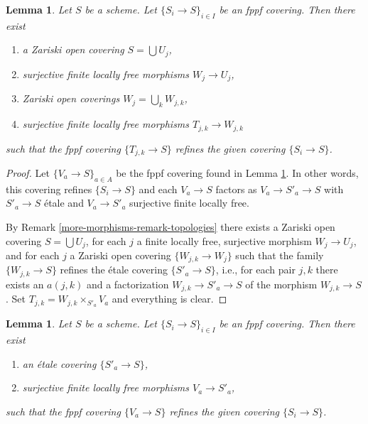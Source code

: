 \documentclass{amsart}
\theoremstyle{plain}
\newtheorem{lemma}[subsection]{Lemma}
\theoremstyle{definition}
\theoremstyle{remark}
\numberwithin{equation}{subsection}
\begin{document}
\begin{lemma}
\label{more-morphisms-lemma-dominate-fppf}
Let $S$ be a scheme. Let $\{S_i \to S\}_{i \in I}$ be an fppf covering.
Then there exist
\begin{enumerate}
\item a Zariski open covering $S = \bigcup U_j$,
\item surjective finite locally free morphisms $W_j \to U_j$,
\item Zariski open coverings $W_j = \bigcup_k W_{j, k}$,
\item surjective finite locally free morphisms $T_{j, k} \to W_{j, k}$
\end{enumerate}
such that the fppf covering $\{T_{j, k} \to S\}$ refines the given
covering $\{S_i \to S\}$.
\end{lemma}

\begin{proof}
Let $\{V_a \to S\}_{a \in A}$ be the fppf covering found in
Lemma \ref{more-morphisms-lemma-dominate-fppf-etale-locally}.
In other words, this covering refines
$\{S_i \to S\}$
and each $V_a \to S$ factors as
$V_a \to S'_a \to S$ with $S'_a \to S$ \'etale and $V_a \to S'_a$
surjective finite locally free.

\medskip\noindent
By
Remark \ref{more-morphisms-remark-topologies}
there exists a Zariski open covering $S = \bigcup U_j$,
for each $j$ a finite locally free, surjective morphism
$W_j \to U_j$, and for each $j$ a Zariski open covering
$\{W_{j, k} \to W_j\}$ such that the family
$\{W_{j, k} \to S\}$ refines the \'etale covering
$\{S'_a \to S\}$, i.e., for each pair $j, k$ there exists
an $a(j, k)$ and a factorization $W_{j, k} \to S'_a \to S$
of the morphism $W_{j, k} \to S$. Set
$T_{j, k} = W_{j, k} \times_{S'_a} V_a$ and everything is clear.
\end{proof}


\begin{lemma}
\label{more-morphisms-lemma-dominate-fppf-etale-locally}
Let $S$ be a scheme. Let $\{S_i \to S\}_{i \in I}$ be an fppf covering.
Then there exist
\begin{enumerate}
\item an \'etale covering $\{S'_a \to S\}$,
\item surjective finite locally free morphisms $V_a \to S'_a$,
\end{enumerate}
such that the fppf covering $\{V_a \to S\}$ refines the given
covering $\{S_i \to S\}$.
\end{lemma}
\end{document}
